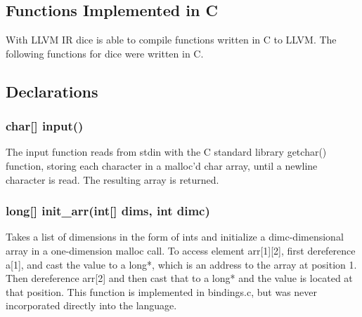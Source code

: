 \begin{homeworkProblem}
	\subsection{Functions Implemented in C}
	With LLVM IR dice is able to compile functions written in C to LLVM. The following functions for dice were written in C.
	
	\subsection{Declarations}
	\subsubsection{char[] input()}
	The input function reads from stdin with the C standard library getchar() function, storing each character in a malloc'd char array, until a newline character is read. The resulting array is returned.
	\subsubsection{long[] init\_arr(int[] dims, int dimc)}
	Takes a list of dimensions in the form of ints and initialize a dimc-dimensional array in a one-dimension malloc call. To access element arr[1][2], first dereference a[1], and cast the value to a long*, which is an address to the array at position 1. Then dereference arr[2] and then cast that to a long* and the value is located at that position. This function is implemented in bindings.c, but was never incorporated directly into the language. 
\end{homeworkProblem}
